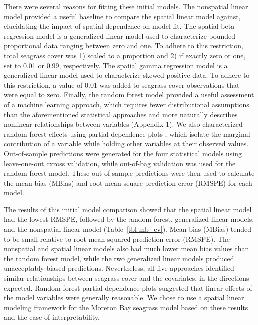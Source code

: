 \documentclass[
  letterpaper,
  DIV=11,
  numbers=noendperiod]{scrartcl}
\begin{document}
There were several reasons for fitting these initial models. The
nonspatial linear model provided a useful baseline to compare the
spatial linear model against, elucidating the impact of spatial
dependence on model fit. The spatial beta regression model is a
generalized linear model used to characterize bounded proportional data
ranging between zero and one. To adhere to this restriction, total
seagrass cover was 1) scaled to a proportion and 2) if exactly zero or
one, set to 0.01 or 0.99, respectively. The spatial gamma regression
model is a generalized linear model used to characterize skewed positive
data. To adhere to this restriction, a value of 0.01 was added to
seagrass cover observations that were equal to zero. Finally, the random
forest model provided a useful assessment of a machine learning
approach, which requires fewer distributional assumptions than the
aforementioned statistical approaches and more naturally describes
nonlinear relationships between variables (Appendix 1). We also
characterized random forest effects using partial dependence plots
\citep{greenwell2017pdp}, which isolate the marginal contribution of a
variable while holding other variables at their observed values.
Out-of-sample predictions were generated for the four statistical models
using leave-one-out cxross validation, while out-of-bag validation was
used for the random forest model. These out-of-sample predictions were
then used to calculate the mean bias (MBias) and
root-mean-square-prediction error (RMSPE) for each model.

The results of this initial model comparison showed that the spatial
linear model had the lowest RMSPE, followed by the random forest,
generalized linear models, and the nonspatial linear model
(Table~\ref{tbl-mb_cv}). Mean bias (MBias) tended to be small relative
to root-mean-squared-prediction error (RMSPE). The nonspatial and
spatial linear models also had much lower mean bias values than the
random forest model, while the two generalized linear models produced
unacceptably biased predictions. Nevertheless, all five approaches
identified similar relationships between seagrass cover and the
covariates, in the directions expected. Random forest partial dependence
plots \citep{greenwell2017pdp} suggested that linear effects of the
model variables were generally reasonable. We chose to use a spatial
linear modeling framework for the Moreton Bay seagrass model based on
these results and the ease of interpretability.
\end{document}
